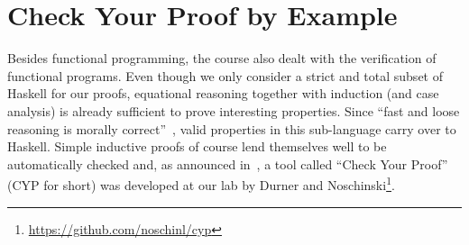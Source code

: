 \section{Check Your Proof by Example}\label{sec:cyp}
Besides functional programming,
the course also dealt with the verification of functional programs.
Even though we only consider a strict and total subset
of Haskell for our proofs,
equational reasoning together with induction
(and case analysis)
is already sufficient to prove interesting properties.
Since ``fast and loose reasoning is morally correct''~\cite{fast_and_loose},
valid properties in this sub-language carry over to Haskell.
Simple inductive proofs of course lend themselves well to be automatically checked and, as announced in~\cite{next_1100}, a tool called ``Check Your Proof'' (CYP for short) was developed at our lab by Durner and Noschinski\footnote{\url{https://github.com/noschinl/cyp}}.

